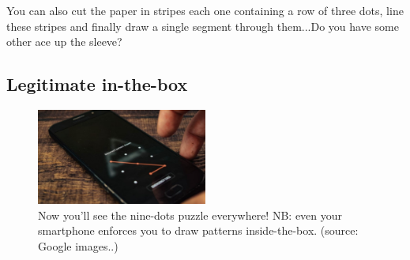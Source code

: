 \documentclass[11pt]{article}
\begin{document}
You can also cut the paper in stripes each one containing a row of three dots, line these stripes and finally draw a single segment through them...Do you have some other ace up the sleeve?

\hypertarget{appendices-in-the-box} {
	\subsection{Legitimate in-the-box}
	\label{appendices-in-the-box}
}
\begin{figure}[H]
\centering
\includegraphics[width=0.5\textwidth]{images/smartphone_nine_dots.jpg}
\caption{Now you'll see the nine-dots puzzle everywhere! NB: even your smartphone enforces you to draw patterns inside-the-box. (source: Google images..)}
\label{smartphone-nine-dots}
\end{figure}
\end{document}
